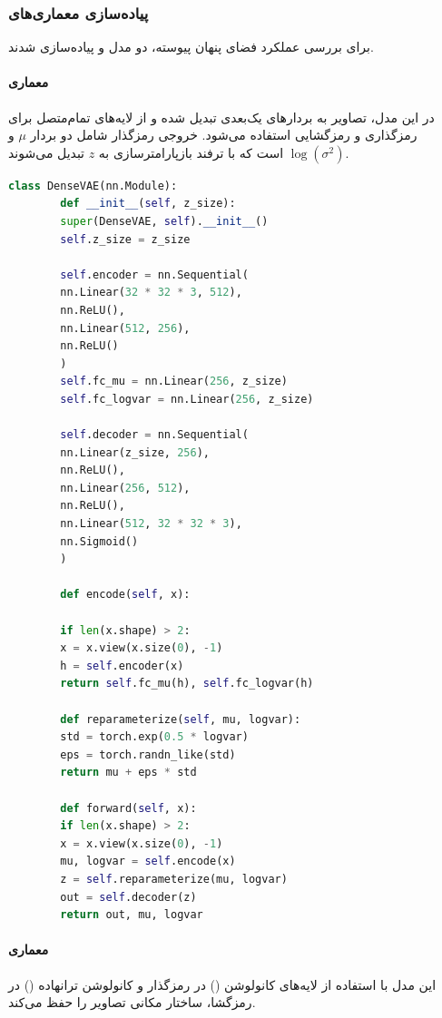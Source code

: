 \documentclass{article}
\begin{document}
\subsubsection{پیاده‌سازی معماری‌های }

برای بررسی عملکرد فضای پنهان پیوسته، دو مدل  و  پیاده‌سازی شدند. 

\paragraph{معماری }
در این مدل، تصاویر به بردارهای یک‌بعدی تبدیل شده و از لایه‌های تمام‌متصل برای رمزگذاری و رمزگشایی استفاده می‌شود. خروجی رمزگذار شامل دو بردار $\mu$ و $\log(\sigma^2)$ است که با ترفند بازپارامترسازی به $z$ تبدیل می‌شوند.

\begin{latin}
	\begin{lstlisting}[language=Python, basicstyle=\ttfamily\scriptsize]
		class DenseVAE(nn.Module):
		def __init__(self, z_size):
		super(DenseVAE, self).__init__()
		self.z_size = z_size
		
		self.encoder = nn.Sequential(
		nn.Linear(32 * 32 * 3, 512),
		nn.ReLU(),
		nn.Linear(512, 256),
		nn.ReLU()
		)
		self.fc_mu = nn.Linear(256, z_size)
		self.fc_logvar = nn.Linear(256, z_size)
		
		self.decoder = nn.Sequential(
		nn.Linear(z_size, 256),
		nn.ReLU(),
		nn.Linear(256, 512),
		nn.ReLU(),
		nn.Linear(512, 32 * 32 * 3),
		nn.Sigmoid()
		)
		
		def encode(self, x):
		
		if len(x.shape) > 2:
		x = x.view(x.size(0), -1)
		h = self.encoder(x)
		return self.fc_mu(h), self.fc_logvar(h)
		
		def reparameterize(self, mu, logvar):
		std = torch.exp(0.5 * logvar)
		eps = torch.randn_like(std)
		return mu + eps * std
		
		def forward(self, x):
		if len(x.shape) > 2:
		x = x.view(x.size(0), -1)
		mu, logvar = self.encode(x)
		z = self.reparameterize(mu, logvar)
		out = self.decoder(z)
		return out, mu, logvar
	\end{lstlisting}
\end{latin}

\paragraph{معماری }
این مدل با استفاده از لایه‌های کانولوشن () در رمزگذار و کانولوشن ترانهاده () در رمزگشا، ساختار مکانی تصاویر را حفظ می‌کند.
\end{document}
